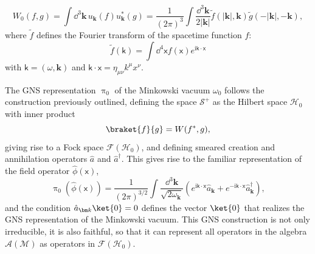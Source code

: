 \documentclass[letterpaper,12pt,titlepage,oneside,final]{book}
\newcommand{\M}{\mathcal{M}}
\renewcommand{\S}{\mathcal{S}}
\newcommand{\mf}{\mathsf}%
\newcommand{\ii}{\mathrm{i}}
\begin{document}
\begin{equation}\label{eq:W0Fourier}
    W_0(f,g) = \int \dd^3 \bm k \,u_{\bm k}(f)u_{\bm k}^*(g) = \frac{1}{(2\pi)^3}\int \frac{\dd^3 \bm k}{{2|\bm k|}} \tilde{f}(|\bm k|, \bm k)\tilde{g}(-|\bm k|,-\bm k),
\end{equation}
where $\tilde{f}$ defines the Fourier transform of the spacetime function $f$:
\begin{equation}\label{eq:4Fourier}
    \tilde{f}(\mf k) = \int \dd^4\mf x f(\mf x) e^{\ii \mf k \cdot \mf x}
\end{equation}
with $\mf k = (\omega,\bm k)$ and $\mf k \cdot \mf x = \eta_{\mu\nu}k^\mu x^\nu$. 

The GNS representation $\uppi_0$ of the Minkowski vacuum $\omega_0$ follows the construction previously outlined, defining the space $\S^+$ as the Hilbert space $\mathscr{H}_0$ with inner product
\begin{equation}
    \braket{f}{g} = W(f^*,g),
\end{equation}
giving rise to a Fock space $\mathcal{F}(\mathscr{H}_0)$, and defining smeared creation and annihilation operators $\hat{a}$ and $\hat{a}^\dagger$. This gives rise to the familiar representation of the field operator $\hat{\phi}(\mf x)$,
\begin{equation}
    \uppi_0(\hat{\phi}(\mf x)) = \frac{1}{(2\pi)^{3/2}}\int \frac{\dd^3 \bm k}{\sqrt{2 \omega_{\bm k}}} \left(e^{\ii \mf k \cdot \mf x}\hat{a}_{\bm k} + e^{-\ii \mf k \cdot \mf x}\hat{a}_{\bm k}^\dagger\right),
\end{equation}
and the condition $\hat{a}_{\bm k}\ket{0} = 0$ defines the vector $\ket{0}$ that realizes the GNS representation of the Minkowski vacuum. This GNS construction is not only irreducible, it is also faithful, so that it can represent all operators in the algebra $\mathcal{A}(\M)$ as operators in $\mathcal{F}(\mathscr{H}_0)$.
\end{document}
